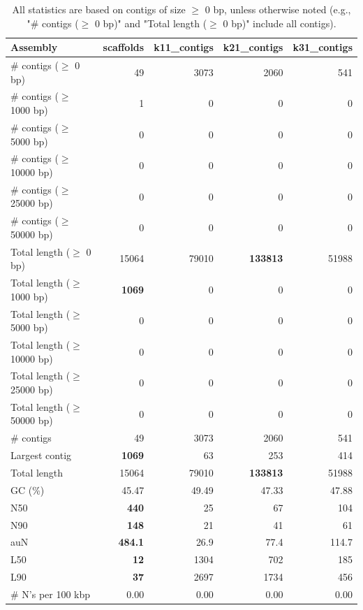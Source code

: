\documentclass[12pt,a4paper]{article}
\begin{document}
\begin{table}[ht]
\begin{center}
\caption{All statistics are based on contigs of size $\geq$ 0 bp, unless otherwise noted (e.g., "\# contigs ($\geq$ 0 bp)" and "Total length ($\geq$ 0 bp)" include all contigs).}
\begin{tabular}{|l*{4}{|r}|}
\hline
Assembly & scaffolds & k11\_contigs & k21\_contigs & k31\_contigs \\ \hline
\# contigs ($\geq$ 0 bp) & 49 & 3073 & 2060 & 541 \\ \hline
\# contigs ($\geq$ 1000 bp) & 1 & 0 & 0 & 0 \\ \hline
\# contigs ($\geq$ 5000 bp) & 0 & 0 & 0 & 0 \\ \hline
\# contigs ($\geq$ 10000 bp) & 0 & 0 & 0 & 0 \\ \hline
\# contigs ($\geq$ 25000 bp) & 0 & 0 & 0 & 0 \\ \hline
\# contigs ($\geq$ 50000 bp) & 0 & 0 & 0 & 0 \\ \hline
Total length ($\geq$ 0 bp) & 15064 & 79010 & {\bf 133813} & 51988 \\ \hline
Total length ($\geq$ 1000 bp) & {\bf 1069} & 0 & 0 & 0 \\ \hline
Total length ($\geq$ 5000 bp) & 0 & 0 & 0 & 0 \\ \hline
Total length ($\geq$ 10000 bp) & 0 & 0 & 0 & 0 \\ \hline
Total length ($\geq$ 25000 bp) & 0 & 0 & 0 & 0 \\ \hline
Total length ($\geq$ 50000 bp) & 0 & 0 & 0 & 0 \\ \hline
\# contigs & 49 & 3073 & 2060 & 541 \\ \hline
Largest contig & {\bf 1069} & 63 & 253 & 414 \\ \hline
Total length & 15064 & 79010 & {\bf 133813} & 51988 \\ \hline
GC (\%) & 45.47 & 49.49 & 47.33 & 47.88 \\ \hline
N50 & {\bf 440} & 25 & 67 & 104 \\ \hline
N90 & {\bf 148} & 21 & 41 & 61 \\ \hline
auN & {\bf 484.1} & 26.9 & 77.4 & 114.7 \\ \hline
L50 & {\bf 12} & 1304 & 702 & 185 \\ \hline
L90 & {\bf 37} & 2697 & 1734 & 456 \\ \hline
\# N's per 100 kbp & 0.00 & 0.00 & 0.00 & 0.00 \\ \hline
\end{tabular}
\end{center}
\end{table}
\end{document}
